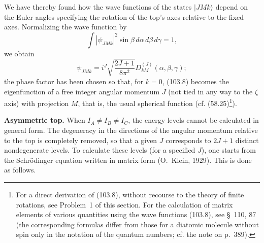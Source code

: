 We have thereby found how the wave functions of the states $|JMk\rangle$ depend on the Euler angles specifying the rotation of the top's axes relative to the fixed axes. Normalizing the wave function by
\[
 \int|\psi_{JMk}|^2\sin\beta\,d\alpha\,d\beta\,d\gamma=1,
\]
we obtain
\begin{equation}
 \psi_{JMk}=i^J\sqrt{\frac{2J+1}{8\pi^2}}D_{kM}^{(J)}(\alpha,\beta,\gamma); \tag{103.8}
\end{equation}
the phase factor has been chosen so that, for $k=0$, (103.8) becomes the eigenfunction of a free integer angular momentum $J$ (not tied in any way to the $\zeta$ axis) with projection $M$, that is, the usual spherical function (cf. (58.25)\footnote{For a direct derivation of (103.8), without recourse to the theory of finite rotations, see Problem~1 of this section. For the calculation of matrix elements of various quantities using the wave functions (103.8), see \S~110, 87 (the corresponding formulas differ from those for a diatomic molecule without spin only in the notation of the quantum numbers; cf. the note on p.~389).}).

\textbf{Asymmetric top.} When $I_A\ne I_B\ne I_C$, the energy levels cannot be calculated in general form. The degeneracy in the directions of the angular momentum relative to the top is completely removed, so that a given $J$ corresponds to $2J+1$ distinct nondegenerate levels. To calculate these levels (for a specified $J$), one starts from the Schrödinger equation written in matrix form (O.~Klein, 1929). This is done as follows.

